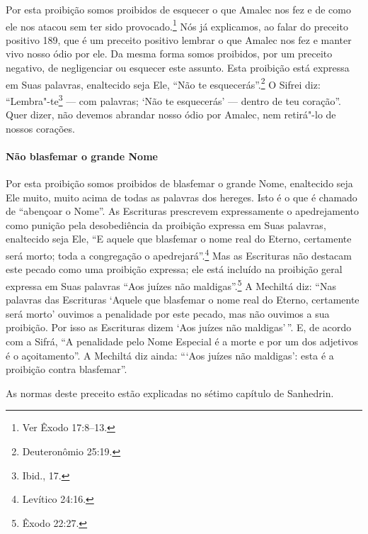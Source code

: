 \begin{multicols}{2}
Por esta proibição somos proibidos de esquecer o que Amalec\starr{} nos fez e de
como ele nos atacou sem ter sido provocado.\footnote{Ver Êxodo 17:8--13.} Nós já
explicamos, ao falar do preceito positivo 189, que é um preceito
positivo lembrar o que Amalec\starr{} nos fez e manter vivo nosso ódio por ele.
Da mesma forma somos proibidos, por um preceito negativo, de
negligenciar ou esquecer este assunto. Esta proibição está expressa em
Suas palavras, enaltecido seja Ele, ``Não te esquecerás''.\footnote{Deuteronômio
25:19.} O Sifrei\starr{} diz: ``Lembra"-te\footnote{Ibid., 17.} --- com palavras; `Não te
esquecerás' --- dentro de teu coração''. Quer dizer, não devemos
abrandar nosso ódio por Amalec\starr, nem retirá"-lo de nossos corações.

\paragraph{Não blasfemar o grande Nome}

Por esta proibição somos proibidos de blasfemar o grande Nome,
enaltecido seja Ele muito, muito acima de todas as palavras dos hereges.
Isto é o que é chamado de ``abençoar o Nome''. As Escrituras prescrevem
expressamente o apedrejamento como punição pela desobediência da
proibição expressa em Suas palavras, enaltecido seja Ele, ``E aquele que
blasfemar o nome real do Eterno, certamente será morto; toda a
congregação o apedrejará''.\footnote{Levítico 24:16.} Mas as Escrituras não
destacam este pecado como uma proibição expressa; ele está incluído na proibição geral expressa em Suas palavras
``Aos juízes não maldigas''.\footnote{Êxodo 22:27.} A Mechiltá\starr{} diz: ``Nas
palavras das Escrituras `Aquele que blasfemar o nome real do Eterno,
certamente será morto' ouvimos a penalidade por este pecado, mas não
ouvimos a sua proibição. Por isso as Escrituras dizem `Aos juízes não
maldigas'\,''. E, de acordo com a Sifrá\starr, ``A penalidade pelo Nome Especial
é a morte e por um dos adjetivos é o açoitamento''. A Mechiltá\starr{} diz
ainda: ```Aos juízes não maldigas': esta é a proibição contra
blasfemar''.

As normas deste preceito estão explicadas no sétimo capítulo de Sanhedrin\starr.


\end{multicols}
